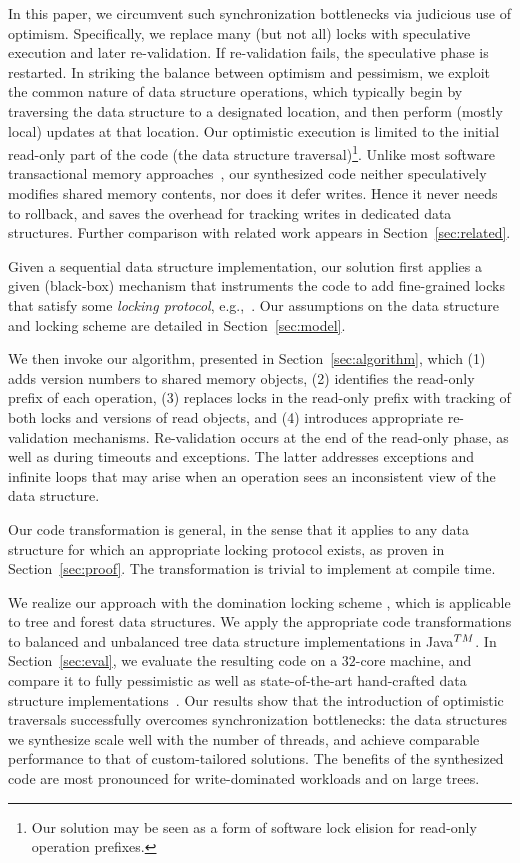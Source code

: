 In this paper, we circumvent such synchronization bottlenecks via judicious use of optimism.
Specifically, we replace many (but not all) locks with speculative execution and later re-validation.
If re-validation fails, the speculative phase is restarted.
In striking the balance between optimism and pessimism, we exploit the common nature of data structure operations,
which typically begin by traversing the data structure to a designated location, and then perform (mostly local) updates at that location.
Our optimistic execution is limited to the initial read-only part of the code (the data structure traversal)\footnote{Our solution may be seen as a form of software lock elision for read-only operation prefixes.}.
Unlike most software transactional memory approaches~\cite{HLR:SLCA2010},
our synthesized code neither speculatively modifies shared memory contents, nor does it defer writes.
Hence it never needs to rollback, and saves the overhead for tracking writes in dedicated data structures.
Further comparison with related work appears in Section~\ref{sec:related}.

Given a sequential data structure implementation,
our solution first applies a given (black-box) mechanism that instruments the code to add
fine-grained locks that satisfy some \emph{locking protocol}, e.g.,~\cite{Gueta2011,MZGB:POPL06}. 
Our assumptions on the data structure and locking scheme are detailed in Section~\ref{sec:model}.

We then invoke our algorithm, presented in Section~\ref{sec:algorithm}, which
(1) adds version numbers to shared memory objects,
(2) identifies the read-only prefix of each operation,
(3) replaces locks in the read-only prefix with tracking of both locks and versions of read objects, and
(4) introduces appropriate re-validation mechanisms.
Re-validation occurs at the end of the read-only phase, as well as during timeouts and exceptions.
The latter addresses exceptions and infinite loops that may arise when an operation sees an inconsistent view of the data structure.

Our code transformation is general, in the sense that it applies to any data structure for which an appropriate locking protocol exists,
as proven in Section~\ref{sec:proof}. The transformation is trivial to implement at compile time.

We realize our approach with the domination locking scheme \cite{Gueta2011},
which is applicable to tree and forest data structures.
We apply the appropriate code transformations to balanced and unbalanced tree data structure implementations in Java$^{\sc TM}$.
In Section~\ref{sec:eval}, we evaluate the resulting code on a $32$-core machine,
and compare it to fully pessimistic as well as state-of-the-art hand-crafted
data structure implementations~\cite{DrachslerVY2014,BronsonCCO2010}.
Our results show that the introduction of optimistic traversals successfully overcomes synchronization bottlenecks:
the data structures we synthesize scale well with the number of threads,
and achieve comparable performance to that of custom-tailored solutions. 
The benefits of the synthesized code are most pronounced for write-dominated workloads and on large trees.

